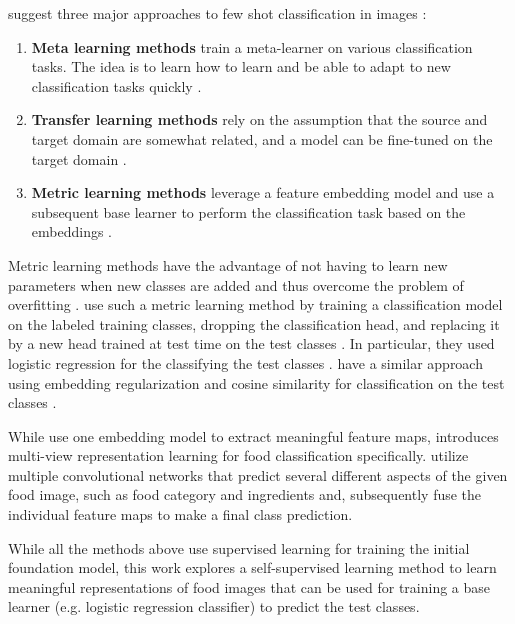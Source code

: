 \citeauthor{li_deep_2023} suggest three major approaches to few shot classification in images \cite{li_deep_2023}:
\begin{enumerate}
	\item{\textbf{Meta learning methods} train a meta-learner on various classification tasks. The idea is to learn
	how to learn and be able to adapt to new classification tasks quickly \cite{li_deep_2023}.}
	\item{\textbf{Transfer learning methods} rely on the assumption that the source and target domain are 
	somewhat related, and a model can be fine-tuned on the target domain \cite{li_deep_2023}.}
	\item{\textbf{Metric learning methods} leverage a feature embedding model and use a subsequent base learner 
	to perform the classification task based on the embeddings \cite{li_deep_2023}.}
\end{enumerate}

Metric learning methods have the advantage of not having to learn new parameters when new classes are added 
and thus overcome the problem of overfitting \cite{li_deep_2023}. \citeauthor{tian_rethinking_2020} use such a metric learning method by training a classification model on the labeled training classes, 
dropping the classification head, and replacing it by a new head trained at test time on the test classes \cite{tian_rethinking_2020}. In particular, they used logistic regression for the classifying the test classes \cite{tian_rethinking_2020}. 
\citeauthor{dhillon_baseline_2020} have a similar approach using embedding regularization and cosine similarity 
for classification on the test classes \cite{dhillon_baseline_2020}.

While \cite{tian_rethinking_2020, dhillon_baseline_2020} use one embedding model to extract meaningful feature maps, 
\cite{jiang_few-shot_2020} introduces multi-view representation learning for food classification specifically.
\citeauthor{jiang_few-shot_2020} utilize multiple convolutional networks that predict several different aspects 
of the given food image, such as food category and ingredients and, subsequently fuse the individual feature maps to 
make a final class prediction.

While all the methods above use supervised learning for training the initial foundation model, this work 
explores a self-supervised learning method to learn meaningful representations of food images that can 
be used for training a base learner (e.g. logistic regression classifier) to predict the test classes.

